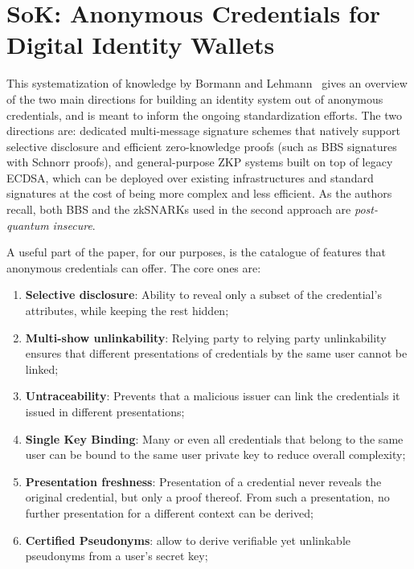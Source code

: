 \documentclass[binding=0.6cm,oneside,noexaminfo]{sapthesis}
\begin{document}
\section{SoK: Anonymous Credentials for Digital Identity Wallets}
\label{sokancred}
This systematization of knowledge by Bormann and Lehmann~\cite{Bormann2026SoK} gives an overview of the two main
directions for building an identity system out of anonymous credentials, and is meant to inform the ongoing
standardization efforts. The two directions are: dedicated multi-message signature schemes that natively support
selective disclosure and efficient zero-knowledge proofs (such as BBS signatures with Schnorr proofs), and
general-purpose ZKP systems built on top of legacy ECDSA, which can be deployed over existing infrastructures and
standard signatures at the cost of being more complex and less efficient. As the authors recall, both BBS and the
zkSNARKs used in the second approach are \emph{post-quantum insecure}.

A useful part of the paper, for our purposes, is the catalogue of features that anonymous credentials can offer. The core ones are:
\begin{enumerate}
      \item \textbf{Selective disclosure}: Ability to reveal only a subset of the credential's attributes, while keeping the rest hidden;
      \item \textbf{Multi-show unlinkability}: Relying party to relying party unlinkability ensures that different presentations of credentials by the same user cannot be linked;
      \item \textbf{Untraceability}: Prevents that a malicious issuer can link the credentials it issued in different presentations;
      \item \textbf{Single Key Binding}: Many or even all credentials that belong to the same user can be bound to the same user private key to reduce overall complexity;
      \item \textbf{Presentation freshness}: Presentation of a credential never reveals the original credential, but only a proof thereof.  From such a presentation, no further presentation for a different context can be derived;
      \item \textbf{Certified Pseudonyms}: allow to derive verifiable yet unlinkable pseudonyms from a user’s secret key;
\end{enumerate}
\end{document}
